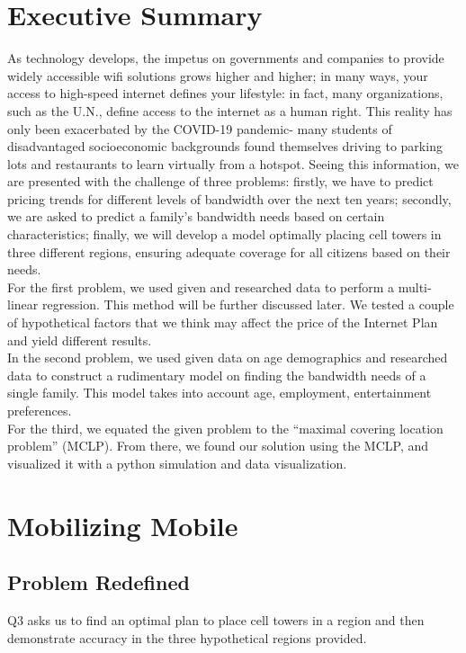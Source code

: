 
\section*{Executive Summary}

	As technology develops, the impetus on governments and companies to provide widely accessible wifi solutions grows higher and higher; in many ways, your access to high-speed internet defines your lifestyle: in fact, many organizations, such as the U.N., define access to the internet as a human right. This reality has only been exacerbated by the COVID-19 pandemic- many students of disadvantaged socioeconomic backgrounds found themselves driving to parking lots and restaurants to learn virtually from a hotspot. Seeing this information, we are presented with the challenge of three problems: firstly, we have to predict pricing trends for different levels of bandwidth over the next ten years; secondly, we are asked to predict a family’s bandwidth needs based on certain characteristics; finally, we will develop a model optimally placing cell towers in three different regions, ensuring adequate coverage for all citizens based on their needs.\\
	\indent For the first problem, we used given and researched data to perform a multi-linear regression. This method will be further discussed later. We tested a couple of hypothetical factors that we think may affect the price of the Internet Plan and yield different results. \\
	\indent In the second problem, we used given data on age demographics and researched data to construct a rudimentary model on finding the bandwidth needs of a single family. This model takes into account age, employment, entertainment preferences.\\ 
	\indent For the third, we equated the given problem to the “maximal covering location problem” (MCLP). From there, we found our solution using the MCLP, and visualized it with a python simulation and data visualization. 

 
\section*{Mobilizing Mobile}
	\subsection{Problem Redefined}
	Q3 asks us to find an optimal plan to place cell towers in a region and then demonstrate accuracy in the three hypothetical regions provided.
		
